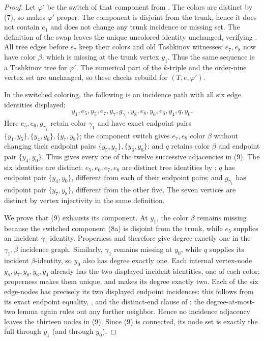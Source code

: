 \begin{proof}
Let $\varphi'$ be the switch of that component from
.  The colors are distinct by (7), so
 makes $\varphi'$ proper.  The
component is disjoint from the trunk, hence it does not contain $e_1$ and
does not change any trunk incidence or missing set.  The definition of
the swap leaves the unique uncolored identity unchanged, verifying
.  All tree edges before $e_7$ keep their
colors and old Tashkinov witnesses; $e_7,e_8$ now have color $\beta$,
which is missing at the trunk vertex $y_1$.  Thus the same sequence is a
Tashkinov tree for $\varphi'$.  The numerical part of the $k$-triple and
the order-nine vertex set are unchanged, so these checks rebuild
 for $(T,e,\varphi')$.

In the switched coloring, the following is an incidence path with all six
edge identities displayed:
\[
 y_1,e_5,y_5,e_7,y_7,g_{\gamma_1},y_8,
 e_8,y_6,e_6,y_4,q,y_0.                            \tag{9}
\]
Here $e_5,e_6,g_{\gamma_1}$ retain color $\gamma_1$ and have exact endpoint
pairs $\{y_1,y_5\},\{y_4,y_6\},\{y_7,y_8\}$; the component switch gives
$e_7,e_8$ color $\beta$ without changing their endpoint pairs
$\{y_5,y_7\},\{y_6,y_8\}$; and $q$ retains color $\beta$ and endpoint pair
$\{y_4,y_0\}$.  Thus  gives every one of
the twelve successive adjacencies in (9).  The six identities are
distinct: $e_5,e_6,e_7,e_8$ are distinct tree identities by
; $q$ has endpoint pair $\{y_4,y_0\}$, different
from each of their endpoint pairs; and $g_{\gamma_1}$ has endpoint pair
$\{y_7,y_8\}$, different from the other five.  The seven vertices are
distinct by vertex injectivity in the same definition.

We prove that (9) exhausts its component.  At $y_1$, the color $\beta$
remains missing because the switched component (8a) is disjoint from the
trunk, while $e_5$ supplies an incident $\gamma_1$-identity.  Properness
and  therefore give degree exactly one in the
$\gamma_1,\beta$ incidence graph.  Similarly, $\gamma_1$ remains missing
at $y_0$, while $q$ supplies its incident $\beta$-identity, so $y_0$ also
has degree exactly one.  Each internal vertex-node
$y_5,y_7,y_8,y_6,y_4$ already has the two displayed incident identities,
one of each color; properness makes them unique, and
 makes its degree exactly two.
Each of the six edge-nodes has precisely its two displayed endpoint
incidences: this follows from its exact endpoint equality,
, and the distinct-end clause of
; the degree-at-most-two lemma again rules out
any further neighbor.  Hence no incidence adjacency leaves the thirteen
nodes in (9).  Since (9) is connected, its node set is exactly the full
 through $y_1$ (and through $y_0$).


\end{proof}
